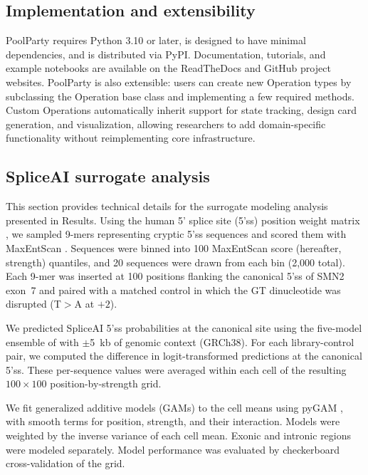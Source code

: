 \documentclass[pdflatex,sn-vancouver-num,referee,lineno,oneside]{sn-jnl}
\begin{document}
\subsection{Implementation and extensibility}\label{subsec:implementation-and-extensibility}

PoolParty requires Python 3.10 or later, is designed to have minimal dependencies, and is distributed via PyPI. Documentation, tutorials, and example notebooks are available on the ReadTheDocs and GitHub project websites. PoolParty is also extensible: users can create new Operation types by subclassing the Operation base class and implementing a few required methods. Custom Operations automatically inherit support for state tracking, design card generation, and visualization, allowing researchers to add domain-specific functionality without reimplementing core infrastructure.

\subsection{SpliceAI surrogate analysis}\label{subsec:spliceai-surrogate-analysis}

This section provides technical details for the surrogate modeling analysis presented in Results. Using the human 5' splice site (5'ss) position weight matrix \citep{Wong2018quantitative}, we sampled 9-mers representing cryptic 5'ss sequences and scored them with MaxEntScan \citep{Yeo2004me}. Sequences were binned into 100 MaxEntScan score (hereafter, strength) quantiles, and 20 sequences were drawn from each bin (2,000 total). Each 9-mer was inserted at 100 positions flanking the canonical 5'ss of SMN2 exon~7 and paired with a matched control in which the GT dinucleotide was disrupted (T$>$A at $+2$).

We predicted SpliceAI 5'ss probabilities at the canonical site using the five-model ensemble of \citet{Jaganathan2019ps} with $\pm$5~kb of genomic context (GRCh38). For each library-control pair, we computed the difference in logit-transformed predictions at the canonical 5'ss. These per-sequence values were averaged within each cell of the resulting $100 \times 100$ position-by-strength grid.

We fit generalized additive models (GAMs) to the cell means using pyGAM \citep{Serven2018pg}, with smooth terms for position, strength, and their interaction. Models were weighted by the inverse variance of each cell mean. Exonic and intronic regions were modeled separately. Model performance was evaluated by checkerboard cross-validation of the grid.
\end{document}
